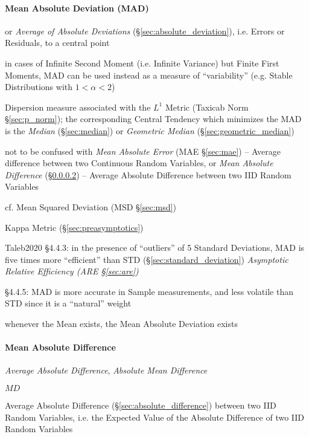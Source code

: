 \paragraph{Mean Absolute Deviation (MAD)}\label{sec:mad}\hfill

or \emph{Average of Absolute Deviations} (\S\ref{sec:absolute_deviation}), i.e.
Errors or Residuals, to a central point

in cases of Infinite Second Moment (i.e. Infinite Variance) but Finite First
Moments, MAD can be used instead as a measure of ``variability'' (e.g. Stable
Distributions with $1 < \alpha < 2$)

Dispersion measure associated with the $L^1$ Metric (Taxicab Norm
\S\ref{sec:p_norm}); the corresponding Central Tendency which minimizes the MAD
is the \emph{Median} (\S\ref{sec:median}) or \emph{Geometric Median}
(\S\ref{sec:geometric_median})

\fist not to be confused with \emph{Mean Absolute Error} (MAE \S\ref{sec:mae})
-- Average difference between two Continuous Random Variables,
or \emph{Mean Absolute Difference} (\S\ref{sec:mean_absolute_difference}) --
Average Absolute Difference between two IID Random Variables

cf. Mean Squared Deviation (MSD \S\ref{sec:msd})

Kappa Metric (\S\ref{sec:preasymptotics})

Taleb2020 \S 4.4.3: in the presence of ``outliers'' of 5 Standard Deviations,
MAD is five times more ``efficient'' than STD (\S\ref{sec:standard_deviation})
\fist \emph{Asymptotic Relative Efficiency (ARE \S\ref{sec:are})}

\S 4.4.5: MAD is more accurate in Sample measurements, and less volatile than
STD since it is a ``natural'' weight

whenever the Mean exists, the Mean Absolute Deviation exists



\paragraph{Mean Absolute Difference}
\label{sec:mean_absolute_difference}\hfill

\emph{Average Absolute Difference}, \emph{Absolute Mean Difference}

$MD$

Average Absolute Difference (\S\ref{sec:absolute_difference}) between two IID
Random Variables, i.e. the Expected Value of the Absolute Difference of two IID
Random Variables

